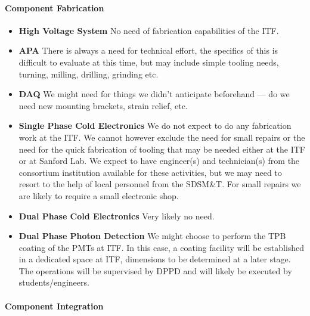 \paragraph{\bf Component Fabrication} 

\begin{itemize}
  \item {\bf High Voltage System} No need of fabrication capabilities
    of the ITF.
  \item {\bf APA} There is always a need for technical effort, the
    specifics of this is difficult to evaluate at this time, but may
    include simple tooling needs, turning, milling, drilling, grinding
    etc.
  \item {\bf DAQ} We might need for things we didn't anticipate
    beforehand --- do we need new mounting brackets, strain relief,
    etc.
  \item {\bf Single Phase Cold Electronics} We do not expect to do any
    fabrication work at the ITF. We cannot however exclude the need
    for small repairs or the need for the quick fabrication of tooling
    that may be needed either at the ITF or at Sanford Lab. We expect
    to have engineer(s) and technician(s) from the consortium
    institution available for these activities, but we may need to
    resort to the help of local personnel from the SDSM\&T. For small
    repairs we are likely to require a small electronic shop.
  \item {\bf Dual Phase Cold Electronics} Very likely no need.
  \item {\bf Dual Phase Photon Detection} We might choose to perform
    the TPB coating of the PMTs at ITF. In this case, a coating
    facility will be established in a dedicated space at ITF,
    dimensions to be determined at a later stage. The operations will
    be supervised by DPPD and will likely be executed by
    students/engineers.
\end{itemize}

\paragraph{\bf Component Integration}

